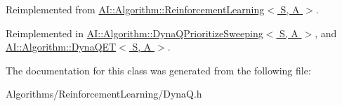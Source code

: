 Reimplemented from \hyperlink{classAI_1_1Algorithm_1_1ReinforcementLearning_a25d7fa245a79e61061436dc0f1db90cb}{A\+I\+::\+Algorithm\+::\+Reinforcement\+Learning$<$ S, A $>$}.



Reimplemented in \hyperlink{classAI_1_1Algorithm_1_1DynaQPrioritizeSweeping_ad08b55f3cf927189dd31abf9fc1c2959}{A\+I\+::\+Algorithm\+::\+Dyna\+Q\+Prioritize\+Sweeping$<$ S, A $>$}, and \hyperlink{classAI_1_1Algorithm_1_1DynaQET_a53b0e06842fbb802acfa5384a84ad448}{A\+I\+::\+Algorithm\+::\+Dyna\+Q\+E\+T$<$ S, A $>$}.



The documentation for this class was generated from the following file\+:\begin{DoxyCompactItemize}
\item 
Algorithms/\+Reinforcement\+Learning/Dyna\+Q.\+h\end{DoxyCompactItemize}

